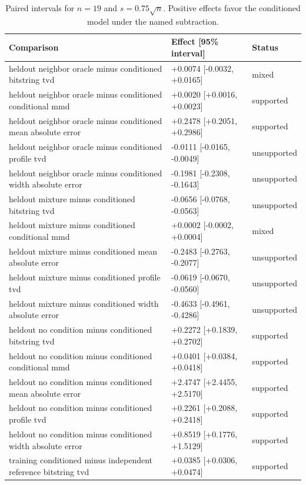 \begin{table}[p]
\centering
\scriptsize
\setlength{\tabcolsep}{4pt}
\caption{Paired intervals for $n=19$ and $s=0.75\sqrt n$. Positive effects favor the conditioned model under the named subtraction.}
\label{tab:all-intervals-n19-w0.75}
\begin{tabular}{@{}p{}p{}p{}@{}}
\toprule
Comparison & Effect [95\% interval] & Status\\
\midrule
heldout neighbor oracle minus conditioned bitstring tvd & +0.0074 [-0.0032, +0.0165] & mixed \\
heldout neighbor oracle minus conditioned conditional mmd & +0.0020 [+0.0016, +0.0023] & supported \\
heldout neighbor oracle minus conditioned mean absolute error & +0.2478 [+0.2051, +0.2986] & supported \\
heldout neighbor oracle minus conditioned profile tvd & -0.0111 [-0.0165, -0.0049] & unsupported \\
heldout neighbor oracle minus conditioned width absolute error & -0.1981 [-0.2308, -0.1643] & unsupported \\
heldout mixture minus conditioned bitstring tvd & -0.0656 [-0.0768, -0.0563] & unsupported \\
heldout mixture minus conditioned conditional mmd & +0.0002 [-0.0002, +0.0004] & mixed \\
heldout mixture minus conditioned mean absolute error & -0.2483 [-0.2763, -0.2077] & unsupported \\
heldout mixture minus conditioned profile tvd & -0.0619 [-0.0670, -0.0560] & unsupported \\
heldout mixture minus conditioned width absolute error & -0.4633 [-0.4961, -0.4286] & unsupported \\
heldout no condition minus conditioned bitstring tvd & +0.2272 [+0.1839, +0.2702] & supported \\
heldout no condition minus conditioned conditional mmd & +0.0401 [+0.0384, +0.0418] & supported \\
heldout no condition minus conditioned mean absolute error & +2.4747 [+2.4455, +2.5170] & supported \\
heldout no condition minus conditioned profile tvd & +0.2261 [+0.2088, +0.2418] & supported \\
heldout no condition minus conditioned width absolute error & +0.8519 [+0.1776, +1.5129] & supported \\
training conditioned minus independent reference bitstring tvd & +0.0385 [+0.0306, +0.0474] & supported \\

\end{tabular}
\end{table}
